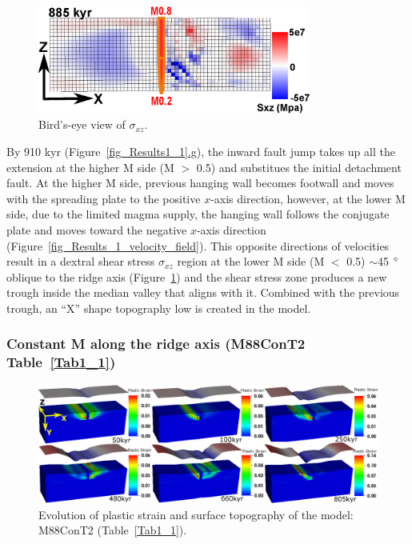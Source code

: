 \begin{figure}[h]
  \centering
    \includegraphics[width=0.8\textwidth]{./Figures/fig_Results_1_Sxz.eps}
  \caption{Bird's-eye view of $\sigma_{xz}$.}
 \label{fig_Results_1_Sxz}
\end{figure}

By 910 kyr (Figure~\hyperref[fig_Results1_1]{\ref{fig_Results1_1}.g}), the inward fault jump takes up all the extension at the higher M side (M $>$ 0.5) and substitues the initial detachment fault. At the higher M side, previous hanging wall becomes footwall and moves with the spreading plate to the positive $x$-axis direction, however, at the lower M side, due to the limited magma supply, the hanging wall follows the conjugate plate and moves toward the negative $x$-axis direction (Figure~\hyperref[fig_Results_1_velocity_field]{\ref{fig_Results_1_velocity_field}}). This opposite directions of velocities result in a dextral shear stress $\sigma_{xz}$ region at the lower M side (M $<$ 0.5) $\sim$45 $\degree$ oblique to the ridge axis (Figure~\hyperref[fig_Results_1_Sxz]{\ref{fig_Results_1_Sxz}}) and the shear stress zone produces a new trough inside the median valley that aligns with it. Combined with the previous trough, an ``X'' shape topography low is created in the model.

\subsubsection{Constant M along the ridge axis (M88ConT2 Table~\hyperref[Tab1_1]{\ref{Tab1_1}})}

\begin{figure}[h]
  \centering
    \includegraphics[width=1.0\textwidth]{./Figures/fig_Results1_3.eps}
  \caption{Evolution of plastic strain and surface topography of the model: M88ConT2 (Table~\hyperref[Tab1_1]{\ref{Tab1_1}}).}
 \label{fig_Results1_3}
\end{figure}   

